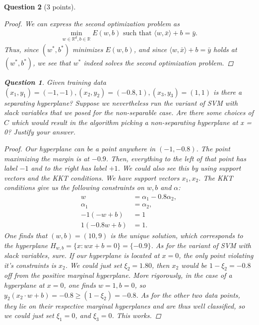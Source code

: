 \documentclass[12pt]{article}
\newcommand{\real}{\mathbb{R}}
\newcommand\set[1]{\{#1\}}
\newtheorem{question}{Question}
\begin{document}
\begin{question}[3 points]
\begin{proof}
    We can express the second optimization problem as
    \begin{align*}
      \min\limits_{w \in \real^d, b \in \real} E(w,b) \text{ such that } \langle w, \bar{x} \rangle + b = \bar{y}.
    \end{align*}
    Thus, since $(w^*, b^*)$ minimizes $E(w,b)$, and since $\langle w, \bar{x} \rangle + b = \bar{y}$ holds at $(w^*, b^*)$, we see that $w^*$ indeed solves the second optimization problem.
  \end{proof}
  \begin{question}
    Given training data $(x_1, y_1) = (-1, -1), (x_2, y_2) = (-0.8, 1), (x_3, y_3) = (1,1)$ is there a separating hyperplane? Suppose we nevertheless run the variant of SVM with slack variables that we posed for the non-separable case. Are there some choices of $C$ which would result in the algorithm picking a non-separating hyperplane at x = 0? Justify your answer.
    
  \end{question}
  \begin{proof}
    Our hyperplane can be a point anywhere in $(-1, -0.8)$. The point maximizing the margin is at $-0.9$. Then, everything to the left of that point has label $-1$ and to the right has label $+1$. We could also see this by using support vectors and the KKT conditions. We have support vectors $x_1, x_2$. The KKT conditions give us the following constraints on $w,b$ and $\alpha$:
    \begin{align*}
      w &= \alpha_1 - 0.8\alpha_2, \\
      \alpha_1 &= \alpha_2, \\
      -1(-w + b) &= 1 \\
      1(-0.8w + b) &= 1 .
    \end{align*}
    One finds that $(w,b)=(10,9)$ is the unique solution, which corresponds to the hyperplane $H_{w,b} = \set{x: wx+b = 0} = \set{-0.9}$.
    \bigbreak
    As for the variant of SVM with slack variables, sure. If our hyperplane is located at $x=0$, the only point violating it's constraints is $x_2$. We could just set $\xi_2 = 1.80$, then $x_2$ would be $1-\xi_2 = -0.8$ off from the positive marginal hyperplane. More rigorously, in the case of a hyperplane at $x=0$, one finds $w=1, b=0$, so $y_2(x_2 \cdot w + b) = -0.8 \geq (1 - \xi_2) = -0.8$. As for the other two data points, they lie on their respective marginal hyperplanes and are thus well classified, so we could just set $\xi_1 = 0$, and $\xi_3 = 0$. This works. 
  \end{proof}
\end{question}
\end{document}
